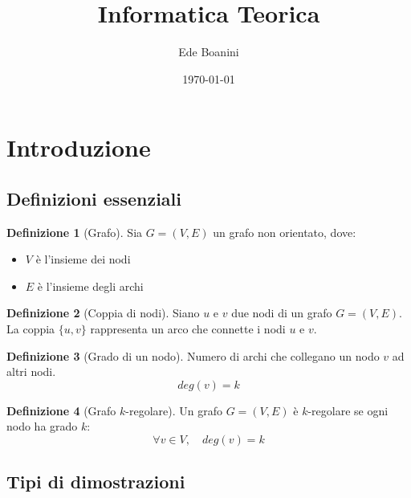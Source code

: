 \documentclass{article}  %
\title{Informatica Teorica}
\author{Ede Boanini}
\date{\today}
\theoremstyle{definition}
\newtheorem{definition}{Definizione}[section]
\begin{document}
\maketitle
\tableofcontents %
\newpage
\section{Introduzione}
\subsection{Definizioni essenziali}
\begin{definition}[Grafo]
	Sia \(G=(V,E)\) un grafo non orientato, dove:
	\begin{itemize}
		\item \(V\) è l'insieme dei nodi
		\item \(E\) è l'insieme degli archi
	\end{itemize}
\end{definition}
\begin{definition}[Coppia di nodi]
	Siano \(u\) e \(v\) due nodi di un grafo \(G = (V,E)\).
	La coppia \(\{u,v\}\) rappresenta un arco che connette i nodi \(u\) e \(v\).
\end{definition}
\begin{definition}[Grado di un nodo]
	Numero di archi che collegano un nodo $v$ ad altri nodi.
	\[
		deg(v)=k
	\]
\end{definition}
\begin{definition}[Grafo $k$-regolare]
	Un grafo \(G=(V,E)\) è $k$-regolare se ogni nodo ha grado $k$:
	\[
		\forall v \in V, \quad deg(v)=k
	\]
\end{definition}
\subsection{Tipi di dimostrazioni}
\end{document}
